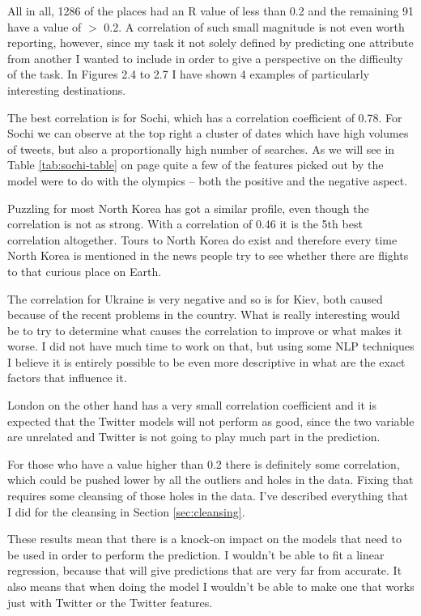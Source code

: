 \documentclass[minf,twoside,singlespacing,parskip,frontabs,notimes,11pt]{infthesis}
\begin{document}
All in all, 1286 of the places had an R value of less than 0.2 and the remaining 91 have a value of $>$ 0.2. A correlation of such small magnitude is not even worth reporting, however, since my task it not solely defined by predicting one attribute from another I wanted to include in order to give a perspective on the difficulty of the task. In Figures 2.4 to 2.7 I have shown 4 examples of particularly interesting destinations. 


The best correlation is for Sochi, which has a correlation coefficient of 0.78. For Sochi we can observe at the top right a cluster of dates which have high volumes of tweets, but also a proportionally high number of searches. As we will see in Table \ref{tab:sochi-table} on page \pageref{tab:sochi-table} quite a few of the features picked out by the model were to do with the olympics -- both the positive and the negative aspect. 

Puzzling for most North Korea has got a similar profile, even though the correlation is not as strong. With a correlation of 0.46 it is the 5th best correlation altogether. Tours to North Korea do exist and therefore every time North Korea is mentioned in the news people try to see whether there are flights to that curious place on Earth.

The correlation for Ukraine is very negative and so is for Kiev, both caused because of the recent problems in the country. What is really interesting would be to try to determine what causes the correlation to improve or what makes it worse. I did not have much time to work on that, but using some NLP techniques I believe it is entirely possible to be even more descriptive in what are the exact factors that influence it. 

London on the other hand has a very small correlation coefficient and it is expected that the Twitter models will not perform as good, since the two variable are unrelated and Twitter is not going to play much part in the prediction. 


For those who have a value higher than 0.2 there is definitely some correlation, which could be pushed lower by all the outliers and holes in the data. Fixing that requires some cleansing of those holes in the data. I've described everything that I did for the cleansing in Section \ref{sec:cleansing}.


These results mean that there is a knock-on impact on the models that need to be used in order to perform the prediction. I wouldn't be able to fit a linear regression, because that will give predictions that are very far from accurate. It also means that when doing the model I wouldn't be able to make one that works just with Twitter or the Twitter features. 
\end{document}
